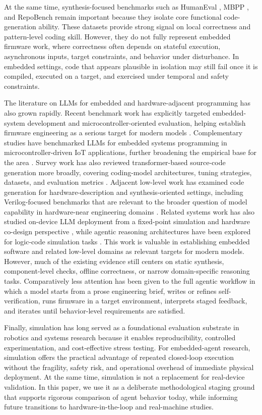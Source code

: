 \documentclass[a4paper,fleqn]{cas-dc}
\begin{document}
At the same time, synthesis-focused benchmarks such as HumanEval \cite{humaneval}, MBPP \cite{mbpp}, and RepoBench \cite{repobench} remain important because they isolate core functional code-generation ability. These datasets provide strong signal on local correctness and pattern-level coding skill. However, they do not fully represent embedded firmware work, where correctness often depends on stateful execution, asynchronous inputs, target constraints, and behavior under disturbance. In embedded settings, code that appears plausible in isolation may still fail once it is compiled, executed on a target, and exercised under temporal and safety constraints.

The literature on LLMs for embedded and hardware-adjacent programming has also grown rapidly. Recent benchmark work has explicitly targeted embedded-system development and microcontroller-oriented evaluation, helping establish firmware engineering as a serious target for modern models \cite{embedbench}. Complementary studies have benchmarked LLMs for embedded systems programming in microcontroller-driven IoT applications, further broadening the empirical base for the area \cite{embedagent}. Survey work has also reviewed transformer-based source-code generation more broadly, covering coding-model architectures, tuning strategies, datasets, and evaluation metrics \cite{ghaemi2024transformers_jsa}. Adjacent low-level work has examined code generation for hardware-description and synthesis-oriented settings, including Verilog-focused benchmarks that are relevant to the broader question of model capability in hardware-near engineering domains \cite{embedded_code_llm, hdl_bench}. Related systems work has also studied on-device LLM deployment from a fixed-point simulation and hardware co-design perspective \cite{kim2025fixedpoint_jsa}, while agentic reasoning architectures have been explored for logic-code simulation tasks \cite{chen2026dcola_jsa}. This work is valuable in establishing embedded software and related low-level domains as relevant targets for modern models. However, much of the existing evidence still centers on static synthesis, component-level checks, offline correctness, or narrow domain-specific reasoning tasks. Comparatively less attention has been given to the full agentic workflow in which a model starts from a prose engineering brief, writes or refines self-verification, runs firmware in a target environment, interprets staged feedback, and iterates until behavior-level requirements are satisfied.

Finally, simulation has long served as a foundational evaluation substrate in robotics \cite{robotics_sim} and systems research \cite{systems_sim_eval} because it enables reproducibility, controlled experimentation, and cost-effective stress testing. For embedded-agent research, simulation offers the practical advantage of repeated closed-loop execution without the fragility, safety risk, and operational overhead of immediate physical deployment. At the same time, simulation is not a replacement for real-device validation. In this paper, we use it as a deliberate methodological staging ground that supports rigorous comparison of agent behavior today, while informing future transitions to hardware-in-the-loop and real-machine studies.
\end{document}
